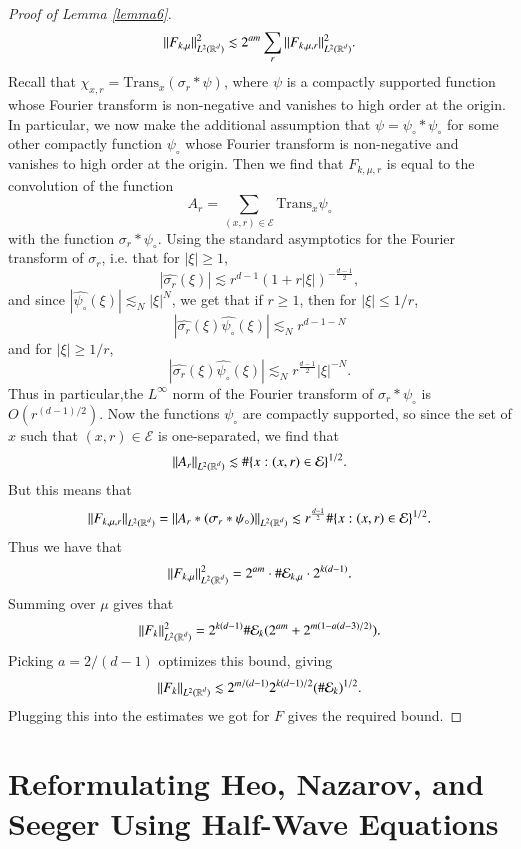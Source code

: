 \begin{proof}[Proof of Lemma \ref{lemma6}]
    \[ \| F_{k,\mu} \|_{L^2(\operatorname{\mathbb{R}}^d)}^2 \lesssim 2^{am} \sum_r \| F_{k,\mu,r} \|_{L^2(\operatorname{\mathbb{R}}^d)}^2. \]
    Recall that $\chi_{x,r} = \text{Trans}_x(\sigma_r * \psi)$, where $\psi$ is a compactly supported function whose Fourier transform is non-negative and vanishes to high order at the origin. In particular, we now make the additional assumption that $\psi = \psi_{\circ} * \psi_{\circ}$ for some other compactly function $\psi_{\circ}$ whose Fourier transform is non-negative and vanishes to high order at the origin. Then we find that $F_{k,\mu,r}$ is equal to the convolution of the function
    \[ A_r = \sum_{(x,r) \in \mathcal{E}} \text{Trans}_x \psi_{\circ} \]
    with the function $\sigma_r * \psi_{\circ}$. Using the standard asymptotics for the Fourier transform of $\sigma_r$, i.e. that for $|\xi| \geq 1$,
    \[ |\widehat{\sigma_r}(\xi)| \lesssim r^{d-1} (1 + r |\xi|)^{- \frac{d-1}{2}}, \]
    and since $|\widehat{\psi_\circ}(\xi)| \lesssim_N |\xi|^N$, we get that if $r \geq 1$, then for $|\xi| \leq 1/r$,
    \[ |\widehat{\sigma_r}(\xi) \widehat{\psi_\circ}(\xi)| \lesssim_N r^{d-1-N} \]
    and for $|\xi| \geq 1/r$,
    \[ |\widehat{\sigma_r}(\xi) \widehat{\psi_\circ}(\xi)| \lesssim_N r^{\frac{d-1}{2}} |\xi|^{-N}. \]
    Thus in particular,the $L^\infty$ norm of the Fourier transform of $\sigma_r * \psi_\circ$ is $O(r^{(d-1)/2})$. Now the functions $\psi_{\circ}$ are compactly supported, so since the set of $x$ such that $(x,r) \in \mathcal{E}$ is one-separated, we find that
    \[ \| A_r \|_{L^2(\operatorname{\mathbb{R}}^d)} \lesssim \# \{ x : (x,r) \in \mathcal{E} \}^{1/2}. \]
    But this means that
    \[ \| F_{k,\mu,r} \|_{L^2(\operatorname{\mathbb{R}}^d)} = \| A_r * (\sigma_r * \psi_{\circ}) \|_{L^2(\operatorname{\mathbb{R}}^d)} \lesssim r^{\frac{d-1}{2}} \# \{ x : (x,r) \in \mathcal{E} \}^{1/2}. \]
    Thus we have that
    \[ \| F_{k,\mu} \|_{L^2(\operatorname{\mathbb{R}}^d)}^2 = 2^{am} \cdot \# \mathcal{E}_{k,\mu} \cdot 2^{k(d-1)}. \]
    Summing over $\mu$ gives that
    \[ \| F_k \|_{L^2(\operatorname{\mathbb{R}}^d)}^2 = 2^{k(d-1)} \# \mathcal{E}_k (2^{am}  + 2^{m(1 - a(d-3)/2)}). \]
    Picking $a = 2/(d-1)$ optimizes this bound, giving
    \[ \| F_k \|_{L^2(\operatorname{\mathbb{R}}^d)} \lesssim 2^{m/(d-1)} 2^{k(d-1)/2} (\# \mathcal{E}_k)^{1/2}. \]
    Plugging this into the estimates we got for $F$ gives the required bound.
\end{proof}

\section{Reformulating Heo, Nazarov, and Seeger Using Half-Wave Equations}

